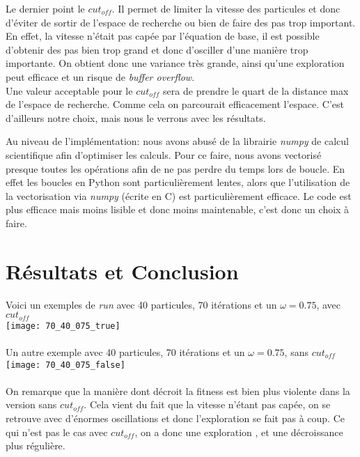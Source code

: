 \documentclass[a4paper, 11pt]{article}
\begin{document}
Le dernier point le $cut_{off}$. Il permet de limiter la vitesse des particules et donc d'éviter de sortir de l'espace de recherche ou
bien de faire des pas trop important. En effet, la vitesse n'était pas capée par l'équation de base, il est possible d'obtenir des pas
bien trop grand et donc d'osciller d'une manière trop importante. On obtient donc une variance très grande, ainsi qu'une exploration 
peut efficace et un risque de \textit{buffer overflow}.\\
Une valeur acceptable pour le $cut_{off}$ sera de prendre le quart de la distance max de l'espace de recherche. Comme cela on parcourait 
efficacement l'espace. C'est d'ailleurs notre choix, mais nous le verrons avec les résultats.

Au niveau de l'implémentation: nous avons abusé de la librairie \textit{numpy} de calcul scientifique afin d'optimiser les calculs. Pour
ce faire, nous avons vectorisé presque toutes les opérations afin de ne pas perdre du temps lors de boucle. En effet les boucles en Python
sont particulièrement lentes, alors que l'utilisation de la vectorisation via \textit{numpy} (écrite en C) est particulièrement efficace.
Le code est plus efficace mais moins lisible et donc moins maintenable, c'est donc un choix à faire.

\section{Résultats et Conclusion}

Voici un exemples de \textit{run} avec 40 particules, 70 itérations et un $\omega = 0.75$, avec $cut_{off}$\\
\texttt{[image: 70\_40\_075\_true]}

\paragraph{}Un autre exemple avec 40 particules, 70 itérations et un $\omega = 0.75$, sans $cut_{off}$\\
\texttt{[image: 70\_40\_075\_false]}

\paragraph{}On remarque que la manière dont décroit la fitness est bien plus violente dans la version sans $cut_{off}$. Cela vient du
fait que la vitesse n'étant pas capée, on se retrouve avec d'énormes oscillations et donc l'exploration se fait pas à coup.
Ce qui n'est pas le cas avec $cut_{off}$, on a donc une exploration , et une décroissance plus régulière.
\end{document}
